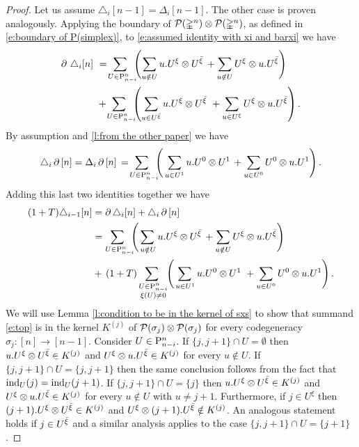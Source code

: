 \begin{proof}
	Let us assume $\triangle_i [n-1] = \Delta_i [n-1]$.
	The other case is proven analogously.
	Applying the boundary of $\cP(\simplex^n) \ot \cP(\simplex^n)$, as defined in \cref{e:boundary of P(simplex)}, to \cref{e:assumed identity with xi and barxi}	we have
	\begin{align*}
	\bd \, \triangle_i [n]\ & =\!
	\sum_{U \in \P_{n-i}^n \kern-5pt} \left(\sum_{u \notin U} {u.U^\xi} \ot {U^\barxi} \, +
	\sum_{u \notin U} {U^\xi} \ot {u.U^\barxi} \right) \\ & +\!
	\sum_{U \in \P_{n-i}^n \kern-5pt} \left(\sum_{u \in U^\barxi} {u.U^\xi} \ot {U^\barxi} \ +
	\sum_{u \in U^{\xi}} {U^\xi} \ot {u.U^\barxi} \right).
	\end{align*}
	By assumption and \cref{l:from the other paper} we have
	\[
	\triangle_i \bd \, [n] =
	\Delta_i \bd \, [n] \, = \!
	\sum_{U \in \P_{n-i}^n \kern-5pt} \left( \,
	\sum_{u \in U^1} {u.U^0} \ot {U^1} \, +
	\sum_{u \in U^0} {U^0} \ot {u.U^1} \right).
	\]
	Adding this last two identities together we have
	\begin{align}
	(1+T) \triangle_{i-1} [n] &= \bd \triangle_i [n] + \triangle_i \bd \, [n] \\ &=
	\label{e:top} \sum_{U \in \P_{n-i}^n \kern-5pt} \left(
	\sum_{\,u \notin U} u.U^\xi \ot U^\barxi \, +
	\sum_{u \notin U} U^\xi \ot u.U^\barxi \right) \\ &+ \,
	\label{e:bottom} (1+T) \sum_{\substack{U \in \P_{n-i}^n \\ \xi(U) \neq 0} \kern-3pt} \left(
	\sum_{\,u \in U^1} {u.U^0} \ot {U^1} \ +
	\sum_{u \in U^0} {U^0} \ot {u.U^1} \right).
	\end{align}
	We will use Lemma \ref{l:condition to be in the kernel of sxs} to show that summand \eqref{e:top} is in the kernel $K^{(j)}$ of $\cP(\sigma_j) \ot \cP(\sigma_j)$ for every codegeneracy $\sigma_j \colon [n] \to [n-1]$.
	Consider $U \in \P_{n-i}^n$.
	If $\{j, j+1\} \cap U = \emptyset$ then $u.U^\xi \ot U^\barxi \in K^{(j)}$ and $U^\xi \ot u.U^\barxi \in K^{(j)}$ for every $u \notin U$.
	If $\{j, j+1\} \cap U = \{j, j+1\}$ then the same conclusion follows from the fact that $\ind_U(j) = \ind_U(j+1)$.
	If $\{j, j+1\} \cap U = \{j\}$ then $u.U^\xi \ot U^\barxi \in K^{(j)}$ and $U^\xi \ot u.U^\barxi \in K^{(j)}$ for every $u \notin U$ with $u \neq j+1$.
	Furthermore, if $j \in U^\xi$ then $(j+1).U^\xi \ot U^\barxi \in K^{(j)}$ and $U^\xi \ot (j+1).U^\barxi \notin K^{(j)}$.
	An analogous statement holds if $j \in U^\barxi$ and a similar analysis applies to the case $\{j, j+1\} \cap U = \{j+1\}$.

\end{proof}
